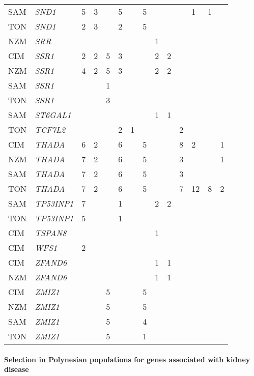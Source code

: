 \documentclass[twoside,openright]{report}
\let\oldparagraph\paragraph
\renewcommand{\paragraph}[1]{\oldparagraph{#1}\mbox{}}
\begin{document}
\begin{ThreePartTable}
\begin{longtable}[t]{llllllllllllll}
SAM & \em{SND1} & 5 & 3 &  & 5 &  & 5 &  &  &  & 1 & 1 & \\
TON & \em{SND1} & 2 & 3 &  & 2 &  & 5 &  &  &  &  &  & \\
NZM & \em{SRR} &  &  &  &  &  &  & 1 &  &  &  &  & \\
CIM & \em{SSR1} & 2 & 2 & 5 & 3 &  &  & 2 & 2 &  &  &  & \\
NZM & \em{SSR1} & 4 & 2 & 5 & 3 &  &  & 2 & 2 &  &  &  & \\
SAM & \em{SSR1} &  &  & 1 &  &  &  &  &  &  &  &  & \\
TON & \em{SSR1} &  &  & 3 &  &  &  &  &  &  &  &  & \\
SAM & \em{ST6GAL1} &  &  &  &  &  &  & 1 & 1 &  &  &  & \\
TON & \em{TCF7L2} &  &  &  & 2 & 1 &  &  &  & 2 &  &  & \\
CIM & \em{THADA} & 6 & 2 &  & 6 &  & 5 &  &  & 8 & 2 &  & 1\\
NZM & \em{THADA} & 7 & 2 &  & 6 &  & 5 &  &  & 3 &  &  & 1\\
SAM & \em{THADA} & 7 & 2 &  & 6 &  & 5 &  &  & 3 &  &  & \\
TON & \em{THADA} & 7 & 2 &  & 6 &  & 5 &  &  & 7 & 12 & 8 & 2\\
SAM & \em{TP53INP1} & 7 &  &  & 1 &  &  & 2 & 2 &  &  &  & \\
TON & \em{TP53INP1} & 5 &  &  & 1 &  &  &  &  &  &  &  & \\
CIM & \em{TSPAN8} &  &  &  &  &  &  & 1 &  &  &  &  & \\
CIM & \em{WFS1} & 2 &  &  &  &  &  &  &  &  &  &  & \\
CIM & \em{ZFAND6} &  &  &  &  &  &  & 1 & 1 &  &  &  & \\
NZM & \em{ZFAND6} &  &  &  &  &  &  & 1 & 1 &  &  &  & \\
CIM & \em{ZMIZ1} &  &  & 5 &  &  & 5 &  &  &  &  &  & \\
NZM & \em{ZMIZ1} &  &  & 5 &  &  & 5 &  &  &  &  &  & \\
SAM & \em{ZMIZ1} &  &  & 5 &  &  & 4 &  &  &  &  &  & \\
TON & \em{ZMIZ1} &  &  & 5 &  &  & 1 &  &  &  &  &  & \\*
\end{longtable}
\end{ThreePartTable}

\endgroup{}

\paragraph{Selection in Polynesian populations for genes associated with
kidney
disease}\label{selection-in-polynesian-populations-for-genes-associated-with-kidney-disease}
\end{document}
